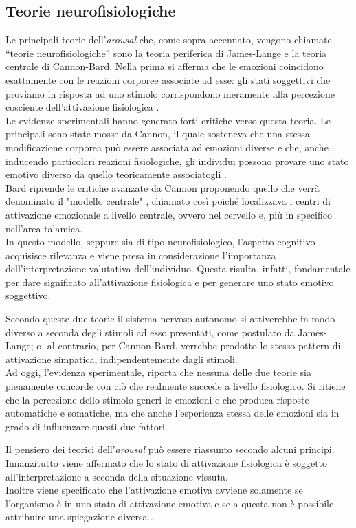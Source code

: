 \subsection{Teorie neurofisiologiche} 
\label{subsec:Teorie neurofisiologiche}
Le principali teorie dell’\textit{arousal} che, come sopra accennato, vengono chiamate “teorie neurofisiologiche” sono la teoria periferica di James-Lange e la teoria centrale di Cannon-Bard. Nella prima si afferma che le emozioni coincidono esattamente con le reazioni corporee associate ad esse: gli stati soggettivi che proviamo in risposta ad uno stimolo corrispondono meramente alla percezione cosciente dell’attivazione fisiologica \parencite{james}.\\
Le evidenze sperimentali hanno generato forti critiche verso questa teoria. Le principali sono state mosse da Cannon, il quale sosteneva che una stessa modificazione corporea può essere associata ad emozioni diverse e che, anche inducendo particolari reazioni fisiologiche, gli individui possono provare uno stato emotivo diverso da quello teoricamente associatogli \parencite{cannon}.\\
Bard riprende le critiche avanzate da Cannon proponendo quello che verrà denominato il 
"modello centrale" \parencite{cannon_bard}, chiamato così poiché localizzava i centri di attivazione emozionale a livello centrale, ovvero nel cervello e, più in specifico nell’area talamica.\\
In questo modello, seppure sia di tipo neurofisiologico, l’aspetto cognitivo acquisisce rilevanza e viene presa in considerazione l’importanza dell’interpretazione valutativa dell’individuo. Questa risulta, infatti, fondamentale per dare significato all’attivazione fisiologica e per generare uno stato emotivo soggettivo.

Secondo queste due teorie il sistema nervoso autonomo si attiverebbe in modo diverso a seconda degli stimoli ad esso presentati, come postulato da James-Lange; o, al contrario, per Cannon-Bard, verrebbe prodotto lo stesso pattern di attivazione simpatica, indipendentemente dagli stimoli.\\
Ad oggi, l'evidenza sperimentale, riporta che nessuna delle due teorie sia pienamente concorde con ciò che realmente succede a livello fisiologico. Si ritiene che la percezione dello stimolo generi le emozioni e che produca risposte automatiche e somatiche, ma che anche l'esperienza stessa delle emozioni sia in grado di influenzare questi due fattori. 

Il pensiero dei teorici dell'\textit{arousal} può essere riassunto secondo alcuni principi. Innanzitutto viene affermato che lo stato di attivazione fisiologica è soggetto all'interpretazione a seconda della situazione vissuta.\\
Inoltre viene specificato che l'attivazione emotiva avviene solamente se l'organismo è in uno stato di attivazione emotiva e se a questa non è possibile attribuire una spiegazione diversa \parencite{psicobiologia}.


